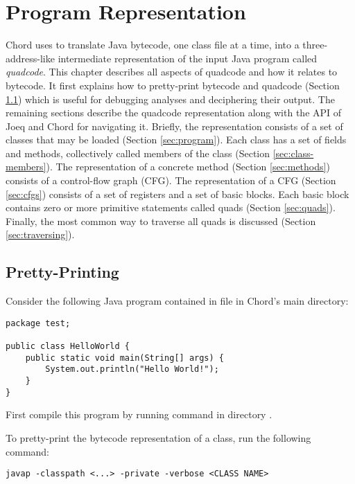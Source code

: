 \chapter{Program Representation}
\label{chap:program-representation}

Chord uses  to translate
Java bytecode, one class file at a time, into a three-address-like
intermediate representation of the input Java program called {\it
quadcode}.  This chapter describes all aspects of quadcode and how it
relates to bytecode.  It first explains how to pretty-print bytecode
and quadcode (Section \ref{sec:pretty-printing}) which is useful for
debugging analyses and deciphering their output.  The remaining
sections describe the quadcode representation along with the API of
Joeq and Chord for navigating it.  Briefly, the representation
consists of a set of classes that may be loaded
(Section \ref{sec:program}).  Each class has a set of fields and
methods, collectively called members of the class
(Section \ref{sec:class-members}).  The representation of a concrete
method (Section \ref{sec:methods}) consists of a control-flow graph
(CFG).  The representation of a CFG (Section \ref{sec:cfgs}) consists
of a set of registers and a set of basic blocks.  Each basic
block contains zero or more primitive statements called quads
(Section \ref{sec:quads}).  Finally, the most common way to traverse
all quads is discussed (Section \ref{sec:traversing}).

\section{Pretty-Printing}
\label{sec:pretty-printing}

Consider the following Java program contained in
file  in Chord's
main directory:
\begin{framed}
\begin{verbatim}
package test;

public class HelloWorld {
    public static void main(String[] args) {
        System.out.println("Hello World!");
    }
}
\end{verbatim}
\end{framed}

First compile this program by running command  in
directory .

To pretty-print the bytecode representation of a class, run the following command:
\begin{framed}
\begin{verbatim}
javap -classpath <...> -private -verbose <CLASS NAME>
\end{verbatim}
\end{framed}

